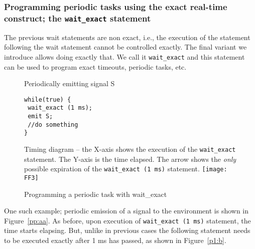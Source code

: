 \subsubsection{Programming periodic tasks using the exact real-time
  construct; the \texttt{wait\_exact} statement}
\label{sec:progr-using-exact}

The previous wait statements are non exact, i.e., the 
execution of the statement following the wait statement cannot be
controlled exactly. The final variant we introduce allows doing exactly
that. We call it \texttt{wait\_exact} and this statement can be used to
program exact timeouts, periodic tasks, etc.

\begin{figure}[t!]
  \centering
	\vspace{-10pt}
        \begin{SubFloat}{\label{pp:aa}Periodically emitting signal S}
        \begin{lstlisting}[style=sysj,morekeywords={emit,trap,pause,exit,wait_exact}]
while(true) { 
 wait_exact (1 ms); 
 emit S; 
 //do something 
}
\end{lstlisting}
\end{SubFloat}

\begin{SubFloat}{\label{p1:b}Timing diagram -- the X-axis shows the
    execution of the \texttt{wait\_exact} statement. The Y-axis is the
    time elapsed. The arrow shows the \textit{only} possible expiration
    of the \texttt{wait\_exact (1 ms)} statement.}
  \texttt{[image: FF3]}
\end{SubFloat}
  \caption{Programming a periodic task with wait\_exact}
  \label{fig:p1}
  \vspace{-10pt}
\end{figure}

One such example; periodic emission of a signal to the environment is
shown in Figure~\ref{pp:aa}. As before, upon execution of
\texttt{wait\_exact (1 ms)} statement, the time starts elapsing. But,
unlike in previous cases the following statement needs to be executed
exactly after 1 ms has passed, as shown in Figure~\ref{p1:b}.



